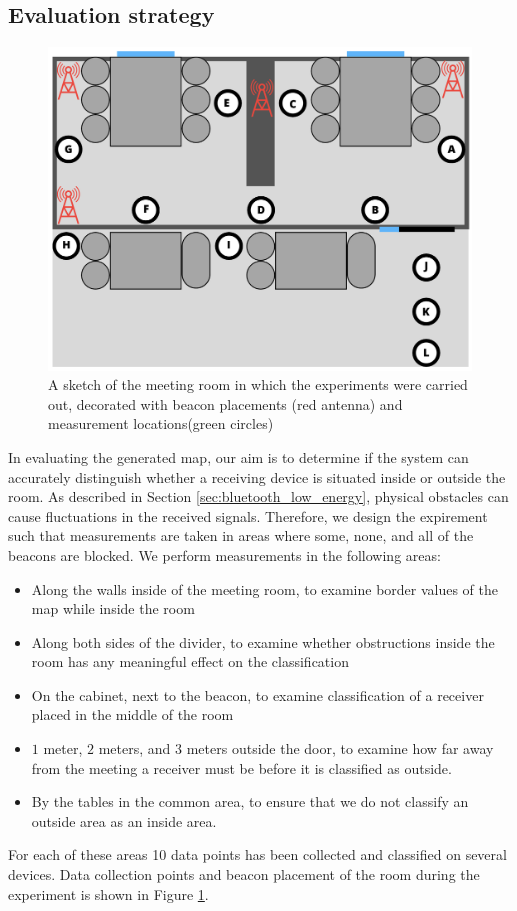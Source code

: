 \subsection{Evaluation strategy} %
\begin{figure}[h]
    \centering
    \includegraphics[scale=0.5]{images/experiment_setup.png}
    \caption{A sketch of the meeting room in which the experiments were carried out, decorated with beacon placements (red antenna) and measurement locations(green circles)}
    \label{fig:experiment_setup}
\end{figure}
In evaluating the generated map, our aim is to determine if the system can accurately distinguish whether a receiving device is situated inside or outside the room.
As described in Section \ref{sec:bluetooth_low_energy}, physical obstacles can cause fluctuations in the received signals. 
Therefore, we design the expirement such that measurements are taken in areas where some, none, and all of the beacons are blocked. 
We perform measurements in the following areas:
\begin{itemize}
    \item Along the walls inside of the meeting room, to examine border values of the map while inside the room
    \item Along both sides of the divider, to examine whether obstructions inside the room has any meaningful effect on the classification
    \item On the cabinet, next to the beacon, to examine classification of a receiver placed in the middle of the room
    \item $1$ meter, $2$ meters, and $3$ meters outside the door, to examine how far away from the meeting a receiver must be before it is classified as outside.
    \item By the tables in the common area, to ensure that we do not classify an outside area as an inside area.
\end{itemize}
For each of these areas 10 data points has been collected and classified on several devices.
Data collection points and beacon placement of the room during the experiment is shown in Figure \ref{fig:experiment_setup}. 
